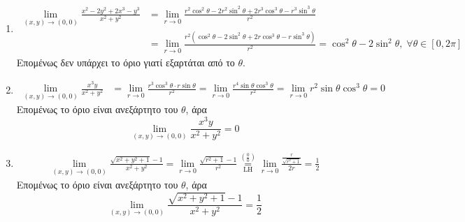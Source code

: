 \begin{examples}
\item {}
    \begin{enumerate}
        \item 
            \begin{align*} \lim\limits_{(x,y)\to (0, 0)} 
                \frac{x^{2}-2y^{2}+2x^{3}-y^{3}}{x^{2}+y^{2}} 
               &= \lim_{r \to 0} \frac{r^{2} \cos^{2}{\theta} - 2r^{2} \sin^{2}{\theta 
               +2r^{3} \cos^{3}{\theta - r^{3} \sin^{3}{\theta}}}}{r^{2}} \\ 
               &= \lim_{r \to 0} \frac{r^{2}(\cos^{2}{\theta} - 2 \sin^{2}{\theta} +2r 
               \cos^{3}{\theta} - r \sin^{3}{\theta})}{r^{2}} = 
               \cos^{2}{\theta} - 2 \sin^{2}{\theta}, \; \forall \theta \in [0, 2 \pi]
            \end{align*}
            Επομένως δεν υπάρχει το όριο γιατί εξαρτάται από το $\theta$.

        \item 
            \begin{align*}
                \lim\limits_{(x,y)\to (0, 0)} \frac{x^{3}y}{x^{2}+y^{2}} &= 
                \lim_{r \to 0} \frac{r^{3} \cos^{3}{\theta} \cdot r 
                    \sin{\theta}}{r^{2}} = \lim_{r \to 0} \frac{r^{4} \sin{\theta} 
                \cos^{3}{\theta}}{r^{2}} = 
                \lim_{r \to 0} r^{2} \sin{\theta} \cos^{3}{\theta} = 0
            \end{align*}
            Επομένως το όριο είναι ανεξάρτητο του $\theta$, άρα 
            \[
                \lim\limits_{(x,y)\to (0,0)} \frac{x^{3}y}{x^{2}+y^{2}} = 0
            \] 

        \item 
            \begin{align*}
                \lim\limits_{(x,y)\to (0, 0)} \frac{\sqrt{x^{2}+y^{2}+1}-1}
                {x^{2}+y^{2}} = \lim_{r \to 0} \frac{\sqrt{r^{2}+1} -1}{r^{2}} 
                \overset{\left(\frac{0}{0}\right)}{\underset{\text{LH}}{=}} 
                \lim_{r \to 0} \frac{\frac{r}{\sqrt{r^{2}+1}}}{2r} = \frac{1}{2}
            \end{align*}
            Επομένως το όριο είναι ανεξάρτητο του $\theta$, άρα 
            \[
                \lim\limits_{(x,y)\to (0, 0)} 
                \frac{\sqrt{x^{2}+y^{2}+1} -1}{x^{2}+y^{2}} = \frac{1}{2} 
            \] 
    \end{enumerate}
    
\end{examples}


